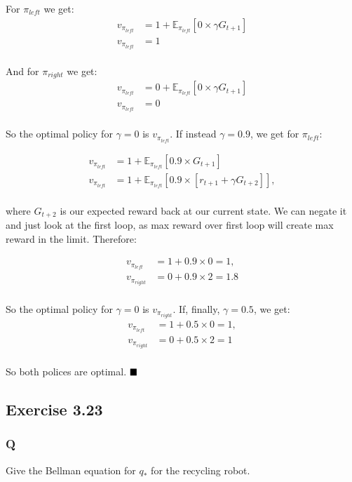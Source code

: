 For $\pi_{left}$ we get:
\begin{align}
v_{\pi_{left}} &= 1 + \mathbb{E}_{\pi_{left}} \left[0 \times \gamma G_{t+1} \right] \\
v_{\pi_{left}} &= 1 \\
\end{align}

And for $\pi_{right}$ we get:
\begin{align}
v_{\pi_{left}} &= 0 + \mathbb{E}_{\pi_{left}} \left[0 \times \gamma G_{t+1} \right] \\
v_{\pi_{left}} &= 0 \\\
\end{align}

So the optimal policy for $\gamma = 0$ is $v_{\pi_{left}}$. If instead $\gamma = 0.9$, we get for $\pi_{left}$:

\begin{align}
v_{\pi_{left}} &= 1 + \mathbb{E}_{\pi_{left}} \left[0.9 \times G_{t+1} \right] \\
v_{\pi_{left}} &= 1 + \mathbb{E}_{\pi_{left}} \left[0.9 \times [r_{t+1} + \gamma G_{t+2}] \right],  \\
\end{align}

where $G_{t+2}$ is our expected reward back at our current state. We can negate it and just look at the first loop, as max reward over first loop will create max reward in the limit. Therefore:

\begin{align}
v_{\pi_{left}} &= 1 + 0.9 \times 0 = 1,\\
v_{\pi_{right}} &= 0 + 0.9 \times 2 = 1.8  \\
\end{align}

So the optimal policy for $\gamma = 0$ is $v_{\pi_{right}}$. If, finally, $\gamma = 0.5$, we get:
\begin{align}
v_{\pi_{left}} &= 1 + 0.5 \times 0 = 1,\\
v_{\pi_{right}} &= 0 + 0.5 \times 2 = 1  \\
\end{align}

So both polices are optimal.
$
\hfill \blacksquare
$

\subsection{Exercise 3.23}
\subsubsection*{Q}
Give the Bellman equation for $q_*$ for the recycling robot.

